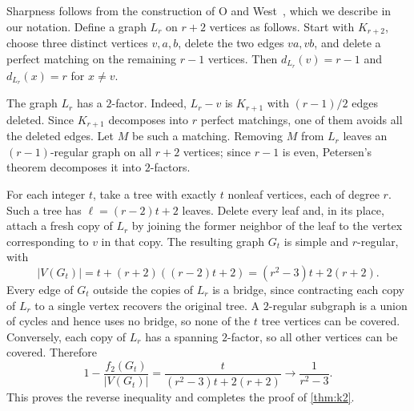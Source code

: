 \documentclass[11pt]{amsart}
\theoremstyle{remark}
\begin{document}
Sharpness follows from the construction of O and West~\cite[Construction~2.1]{OW2010}, which we describe in our notation. Define a graph $L_r$ on $r+2$ vertices as follows. Start with $K_{r+2}$, choose three distinct vertices $v,a,b$, delete the two edges $va,vb$, and delete a perfect matching on the remaining $r-1$ vertices. Then
$d_{L_r}(v)=r-1$ and $d_{L_r}(x)=r$ for $x\ne v$.

The graph $L_r$ has a $2$-factor. Indeed, $L_r-v$ is $K_{r+1}$ with $(r-1)/2$ edges deleted. Since $K_{r+1}$ decomposes into $r$ perfect matchings, one of them avoids all the deleted edges. Let $M$ be such a matching. Removing $M$ from $L_r$ leaves an $(r-1)$-regular graph on all $r+2$ vertices; since $r-1$ is even, Petersen's theorem decomposes it into $2$-factors.

For each integer $t$, take a tree with exactly $t$ nonleaf vertices, each of degree $r$. Such a tree has $\ell=(r-2)t+2$ leaves. Delete every leaf and, in its place, attach a fresh copy of $L_r$ by joining the former neighbor of the leaf to the vertex corresponding to $v$ in that copy. The resulting graph $G_t$ is simple and $r$-regular, with
\[
|V(G_t)|=t+(r+2)((r-2)t+2)=(r^2-3)t+2(r+2).
\]
Every edge of $G_t$ outside the copies of $L_r$ is a bridge, since contracting each copy of $L_r$ to a single vertex recovers the original tree. A $2$-regular subgraph is a union of cycles and hence uses no bridge, so none of the $t$ tree vertices can be covered. Conversely, each copy of $L_r$ has a spanning $2$-factor, so all other vertices can be covered. Therefore
\[
1-\frac{f_2(G_t)}{|V(G_t)|}
=\frac{t}{(r^2-3)t+2(r+2)}
\longrightarrow\frac1{r^2-3}.
\]
This proves the reverse inequality and completes the proof of \cref{thm:k2}.
\end{document}
